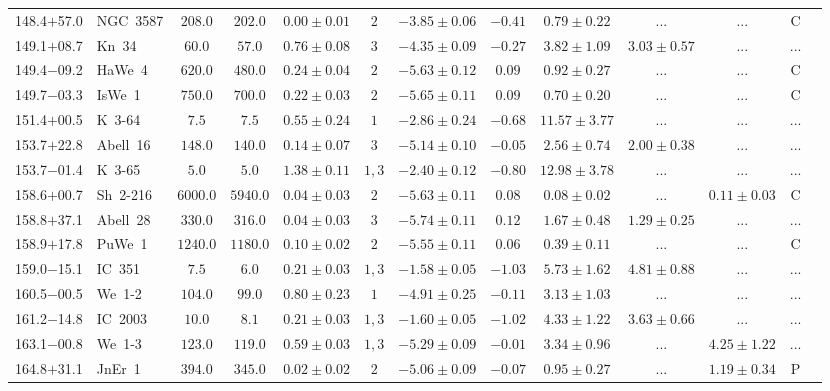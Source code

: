\documentclass[useAMS]{mn2e}
\begin{document}
\begin{center}
{\begin{longtable}{llccccccccccc}
148.4$+$57.0&NGC~3587&$     208.0$&$     202.0$&$0.00 \pm 0.01$&$2$&$-3.85 \pm 0.06$&$     -0.41$&$0.79 \pm 0.22$&$...$&$...$&C\\
149.1$+$08.7&Kn~34&$      60.0$&$      57.0$&$0.76 \pm 0.08$&$3$&$-4.35 \pm 0.09$&$     -0.27$&$3.82 \pm 1.09$&$3.03 \pm 0.57$&$...$&...\\
149.4$-$09.2&HaWe~4&$     620.0$&$     480.0$&$0.24 \pm 0.04$&$2$&$-5.63 \pm 0.12$&$      0.09$&$0.92 \pm 0.27$&$...$&$...$&C\\
149.7$-$03.3&IsWe~1&$     750.0$&$     700.0$&$0.22 \pm 0.03$&$2$&$-5.65 \pm 0.11$&$      0.09$&$0.70 \pm 0.20$&$...$&$...$&C\\
151.4$+$00.5&K~3-64&$       7.5$&$       7.5$&$0.55 \pm 0.24$&$1$&$-2.86 \pm 0.24$&$     -0.68$&$11.57 \pm 3.77$&$...$&$...$&...\\
153.7$+$22.8&Abell~16&$     148.0$&$     140.0$&$0.14 \pm 0.07$&$3$&$-5.14 \pm 0.10$&$     -0.05$&$2.56 \pm 0.74$&$2.00 \pm 0.38$&$...$&...\\
153.7$-$01.4&K~3-65&$       5.0$&$       5.0$&$1.38 \pm 0.11$&$1,3$&$-2.40 \pm 0.12$&$     -0.80$&$12.98 \pm 3.78$&$...$&$...$&...\\
158.6$+$00.7&Sh~2-216&$    6000.0$&$    5940.0$&$0.04 \pm 0.03$&$2$&$-5.63 \pm 0.11$&$      0.08$&$0.08 \pm 0.02$&$...$&$0.11 \pm 0.03$&C\\
158.8$+$37.1&Abell~28&$     330.0$&$     316.0$&$0.04 \pm 0.03$&$3$&$-5.74 \pm 0.11$&$      0.12$&$1.67 \pm 0.48$&$1.29 \pm 0.25$&$...$&...\\
158.9$+$17.8&PuWe~1&$    1240.0$&$    1180.0$&$0.10 \pm 0.02$&$2$&$-5.55 \pm 0.11$&$      0.06$&$0.39 \pm 0.11$&$...$&$...$&C\\
159.0$-$15.1&IC~351&$       7.5$&$       6.0$&$0.21 \pm 0.03$&$1,3$&$-1.58 \pm 0.05$&$     -1.03$&$5.73 \pm 1.62$&$4.81 \pm 0.88$&$...$&...\\
160.5$-$00.5&We~1-2&$     104.0$&$      99.0$&$0.80 \pm 0.23$&$1$&$-4.91 \pm 0.25$&$     -0.11$&$3.13 \pm 1.03$&$...$&$...$&...\\
161.2$-$14.8&IC~2003&$      10.0$&$       8.1$&$0.21 \pm 0.03$&$1,3$&$-1.60 \pm 0.05$&$     -1.02$&$4.33 \pm 1.22$&$3.63 \pm 0.66$&$...$&...\\
163.1$-$00.8&We~1-3&$     123.0$&$     119.0$&$0.59 \pm 0.03$&$1,3$&$-5.29 \pm 0.09$&$     -0.01$&$3.34 \pm 0.96$&$...$&$4.25 \pm 1.22$&...\\
164.8$+$31.1&JnEr~1&$     394.0$&$     345.0$&$0.02 \pm 0.02$&$2$&$-5.06 \pm 0.09$&$     -0.07$&$0.95 \pm 0.27$&$...$&$1.19 \pm 0.34$&P\\

\end{longtable}}
\end{center}
\end{document}

